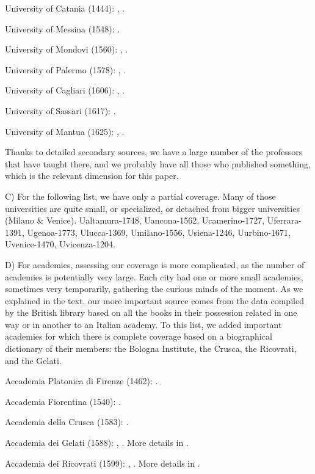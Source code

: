 University of Catania (1444): , .


University of Messina (1548): .

University of Mondovi (1560): , .


University of Palermo (1578):  ,  .


University of Cagliari (1606): , .


University of Sassari (1617): .


University of Mantua (1625): , .


Thanks to detailed secondary sources, we  have a large number of the professors that have taught there, and we probably have all those who published something, which is the relevant dimension for this paper.

C) For the following list, we have only a partial coverage. Many of those universities are quite small, or specialized, or detached from bigger universities (Milano \& Venice).
Ualtamura-1748,
Uancona-1562,
Ucamerino-1727,
Uferrara-1391,
Ugenoa-1773,
Ulucca-1369,
Umilano-1556,
Usiena-1246,
Uurbino-1671,
Uvenice-1470,
Uvicenza-1204.

D) For academies, assessing our coverage is more complicated, as the number of academies is potentially very large. Each city had one or more small academies, sometimes very temporarily, gathering the curious minds of the moment. As we explained in the text, our more important source comes from the data compiled by the British library based on all the books in their possession related in one way or in another to an Italian academy. To this list, we added important academies for which there is complete coverage based on a biographical dictionary of their members: the Bologna Institute, the Crusca, the Ricovrati, and the Gelati.

Accademia Platonica di Firenze (1462): .

Accademia Fiorentina (1540): .

Accademia della Crusca (1583): .

Accademia dei Gelati (1588):  , . More details in .

Accademia dei Ricovrati (1599): , . More details in .

